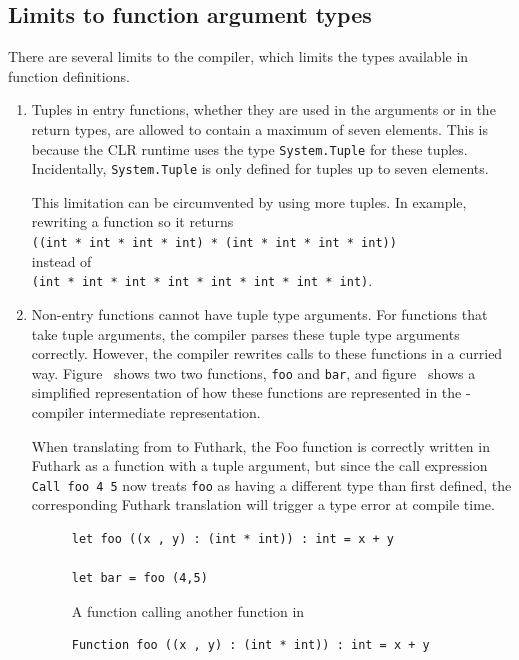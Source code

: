 \subsection{Limits to function argument types}
\label{noteonfsharktypes}
There are several limits to the \fsharp{} compiler, which limits the types
available in function definitions.\\
\begin{enumerate}
\item Tuples in entry functions, whether they are used in the arguments or in the
return types, are allowed to contain a maximum of seven elements. This is
because the CLR runtime uses the type \texttt{System.Tuple} for these tuples.
Incidentally, \texttt{System.Tuple} is only defined for tuples up to seven
elements.

This limitation can be circumvented by using more tuples. In example, rewriting
a function so it returns \\
\texttt{((int * int * int * int) * (int * int * int * int))}\\
instead of\\
\texttt{(int * int * int * int * int * int * int * int)}.

\item Non-entry functions cannot have tuple type arguments.
  For functions that take tuple arguments, the \fsharp{} compiler parses these
  tuple type arguments correctly.
  However, the \fsharp{} compiler rewrites calls to these functions in a curried
  way. Figure~ shows two two \fsharp{} functions, {\tt foo}
    and {\tt bar}, and figure~ shows a simplified 
    representation of how these functions are represented in the
    \fsharp{}-compiler intermediate representation.

  When translating from \fshark{} to Futhark, the Foo function is correctly
  written in Futhark as a function with a tuple argument, but since the call
  expression {\tt Call foo 4 5} now treats \texttt{foo} as having a different 
  type than first defined, the corresponding Futhark translation will trigger 
  a type error at compile time.

\begin{figure}[H]
\centering
\begin{verbatim}
let foo ((x , y) : (int * int)) : int = x + y

let bar = foo (4,5)
\end{verbatim}
\caption{A function calling another function in \fsharp{}}
    \label{fig:astcurried}
    \end{figure}
\begin{figure}[H]
\begin{verbatim}
Function foo ((x , y) : (int * int)) : int = x + y


\end{verbatim}
\end{figure}
\end{enumerate}
